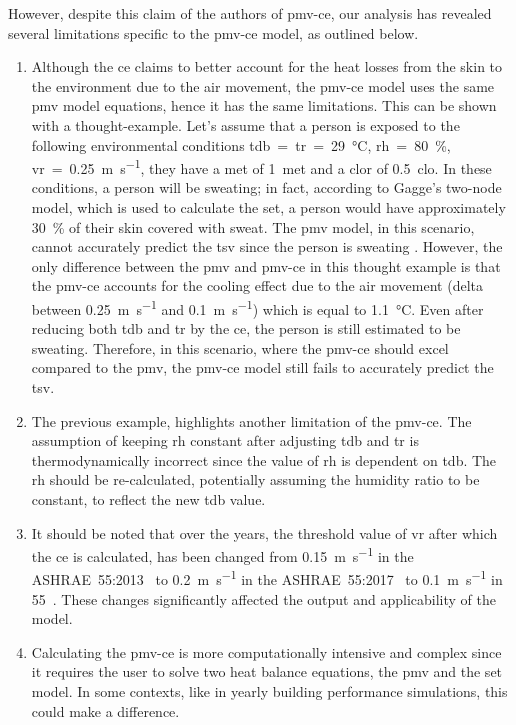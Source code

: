 However, despite this claim of the authors of \ac{pmv-ce}, our analysis has revealed several limitations specific to the \ac{pmv-ce} model, as outlined below.

\begin{enumerate}
    \item Although the \ac{ce} claims to better account for the heat losses from the skin to the environment due to the air movement, the \ac{pmv-ce} model uses the same \ac{pmv} model equations, hence it has the same limitations.
    This can be shown with a thought-example.
    Let's assume that a person is exposed to the following environmental conditions \ac{tdb}~=~\ac{tr}~=~\qty{29}{\celsius}, \ac{rh}~=~\qty{80}{\percent}, \ac{vr}~=~\qty{0.25}{\m\per\s}, they have a \ac{met} of \qty{1}{met} and a \ac{clor} of \qty{0.5}{clo}.
    In these conditions, a person will be sweating; in fact, according to Gagge's two-node model, which is used to calculate the \ac{set}, a person would have approximately \qty{30}{\percent} of their skin covered with sweat.
    The \ac{pmv} model, in this scenario, cannot accurately predict the \ac{tsv} since the person is sweating .
    However, the only difference between the \ac{pmv} and \ac{pmv-ce} in this thought example is that the \ac{pmv-ce} accounts for the cooling effect due to the air movement (delta between \qty{0.25}{\m\per\s} and \qty{0.1}{\m\per\s}) which is equal to \qty{1.1}{\celsius}.
    Even after reducing both \ac{tdb} and \ac{tr} by the \ac{ce}, the person is still estimated to be sweating.
    Therefore, in this scenario, where the \ac{pmv-ce} should excel compared to the \ac{pmv}, the \ac{pmv-ce} model still fails to accurately predict the \ac{tsv}.
    \item The previous example, highlights another limitation of the \ac{pmv-ce}.
    The assumption of keeping \ac{rh} constant after adjusting \ac{tdb} and \ac{tr} is thermodynamically incorrect since the value of \ac{rh} is dependent on \ac{tdb}.
    The \ac{rh} should be re-calculated, potentially assuming the humidity ratio to be constant, to reflect the new \ac{tdb} value.
    \item It should be noted that over the years, the threshold value of \ac{vr} after which the \ac{ce} is calculated, has been changed from \qty{0.15}{\m\per\s} in the ASHRAE~55:2013~\cite{ASHRAE552013} to \qty{0.2}{\m\per\s} in the ASHRAE~55:2017~\cite{ASHRAE552017, arens_moving_2009} to \qty{0.1}{\m\per\s} in \gls{55}~\cite{ashrae552023}.
    These changes significantly affected the output and applicability of the model.
    \item Calculating the \ac{pmv-ce} is more computationally intensive and complex since it requires the user to solve two heat balance equations, the \ac{pmv} and the \ac{set} model.
    In some contexts, like in yearly building performance simulations, this could make a difference. 
\end{enumerate}

